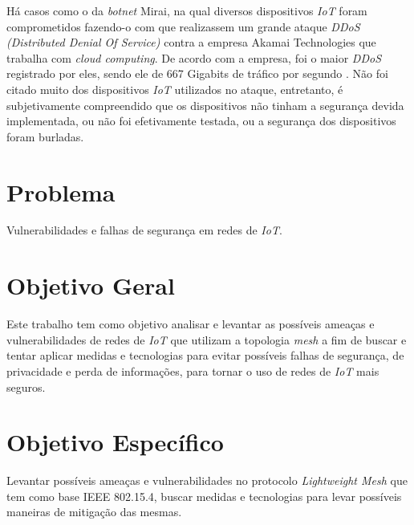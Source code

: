 \par H\'a casos como o da \emph{botnet} Mirai, na qual diversos dispositivos \emph{IoT} foram comprometidos fazendo-o com que realizassem um grande ataque \emph{DDoS (Distributed Denial Of Service)} contra a empresa Akamai Technologies que trabalha com \emph{cloud computing}. De acordo com a empresa, foi o maior \emph{DDoS} registrado por eles, sendo ele de 667 Gigabits de tr\'afico por segundo \cite{miraibotnet}. N\~ao foi citado muito dos dispositivos \emph{IoT} utilizados no ataque, entretanto, \'e subjetivamente compreendido que os dispositivos n\~ao tinham a seguran\c{c}a devida implementada, ou n\~ao foi efetivamente testada, ou a seguran\c{c}a dos dispositivos foram burladas.

\section{Problema}
\par Vulnerabilidades e falhas de segurança em redes de \emph{IoT}.
\section{Objetivo Geral}
\par Este trabalho tem como objetivo analisar e levantar as possíveis ameaças e vulnerabilidades de redes de \emph{IoT} que utilizam a topologia \emph{mesh} a fim de buscar e tentar aplicar medidas e tecnologias para evitar possíveis falhas de segurança, de privacidade e perda de informações, para tornar o uso de redes de \emph{IoT} mais seguros.

\section{Objetivo Espec\'ifico}
\par Levantar poss\'iveis amea\c{c}as e vulnerabilidades no protocolo \emph{Lightweight Mesh} que tem como base IEEE 802.15.4, buscar medidas e tecnologias para levar poss\'iveis maneiras de mitiga\c{c}\~ao das mesmas. 
